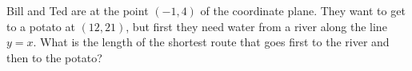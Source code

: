 Bill and Ted are at the point $(-1,4)$ of the coordinate plane. They want to get to a potato at $(12,21)$, but first they need water from a river along the line $y=x$. What is the length of the shortest route that goes first to the river and then to the potato?
